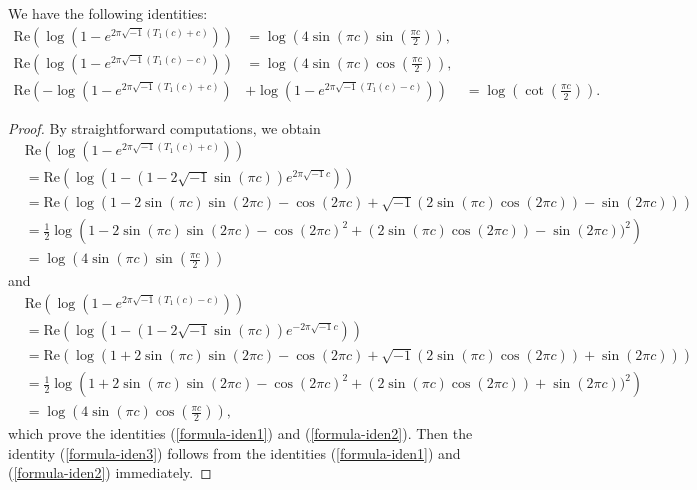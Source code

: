 \documentclass[12pt]{amsart}
\begin{document}
\begin{lemma}
We have the following identities:
\begin{align}
    \text{Re}\left(\log\left(1-e^{2\pi\sqrt{-1}(T_1(c)+c)}\right)\right)&=\log\left(4\sin(\pi c)\sin\left(\frac{\pi c}{2}\right)\right), \label{formula-iden1}\\
     \text{Re}\left(\log\left(1-e^{2\pi\sqrt{-1}(T_1(c)-c)}\right)\right)&=\log\left(4\sin(\pi c)\cos\left(\frac{\pi c}{2}\right)\right), \label{formula-iden2}\\
     \text{Re}\left(-\log\left(1-e^{2\pi\sqrt{-1}(T_1(c)+c)}\right)\right.&\left.+\log\left(1-e^{2\pi\sqrt{-1}(T_1(c)-c)}\right)\right)&=\log\left(\cot\left(\frac{\pi c}{2}\right)\right). \label{formula-iden3}
\end{align}
\end{lemma}
\begin{proof}
By straightforward computations, we obtain
\begin{align*}
    &\text{Re}\left(\log\left(1-e^{2\pi\sqrt{-1}(T_1(c)+c)}\right)\right)\\\nonumber
    &=\text{Re}\left(\log\left(1-(1- 2\sqrt{-1}\sin(\pi c))e^{2\pi\sqrt{-1}c}\right)\right)\\\nonumber
    &=\text{Re}\left(\log(1-2\sin(\pi c)\sin(2\pi c)-\cos(2\pi c)+\sqrt{-1}(2\sin(\pi c)\cos(2\pi c))-\sin(2\pi c))\right)\\\nonumber
    &=\frac{1}{2}\log\left(1-2\sin(\pi c)\sin(2\pi c)-\cos(2\pi c)^2+(2\sin(\pi c)\cos(2\pi c))-\sin(2\pi c))^2\right)\\\nonumber
    &=\log\left(4\sin(\pi c)\sin\left(\frac{\pi c}{2}\right)\right)
\end{align*}
and
\begin{align*}
    &\text{Re}\left(\log\left(1-e^{2\pi\sqrt{-1}(T_1(c)-c)}\right)\right)\\\nonumber
    &=\text{Re}\left(\log\left(1-(1- 2\sqrt{-1}\sin(\pi c))e^{-2\pi\sqrt{-1}c}\right)\right)\\\nonumber
    &=\text{Re}\left(\log(1+2\sin(\pi c)\sin(2\pi c)-\cos(2\pi c)+\sqrt{-1}(2\sin(\pi c)\cos(2\pi c))+\sin(2\pi c))\right)\\\nonumber
    &=\frac{1}{2}\log\left(1+2\sin(\pi c)\sin(2\pi c)-\cos(2\pi c)^2+(2\sin(\pi c)\cos(2\pi c))+\sin(2\pi c))^2\right)\\\nonumber
    &=\log\left(4\sin(\pi c)\cos\left(\frac{\pi c}{2}\right)\right),
\end{align*}
which prove the identities (\ref{formula-iden1}) and (\ref{formula-iden2}). Then the identity (\ref{formula-iden3}) follows from the identities (\ref{formula-iden1}) and (\ref{formula-iden2})  immediately.
\end{proof} 
\end{document}
